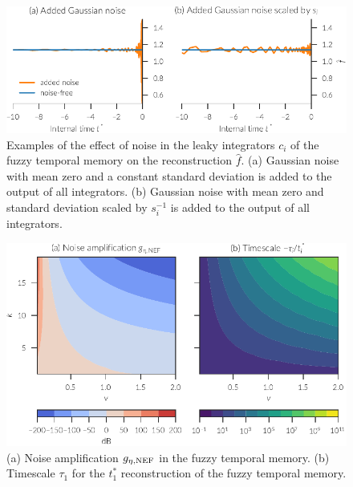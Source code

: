 \begin{figure}
    \centering
    \includegraphics{figures/fuzzy-mem-noise-example}
    \caption[Example of the effect of noise on the fuzzy temporal memory.]{Examples of the effect of noise in the leaky integrators $c_i$ of the fuzzy temporal memory on the reconstruction $\hat{f}$. (a) Gaussian noise with mean zero and a constant standard deviation is added to the output of all integrators. (b) Gaussian noise with mean zero and standard deviation scaled by $s_i^{-1}$ is added to the output of all integrators.}\label{fig:fuzzy-mem-noise-example}
\end{figure}
\begin{figure}
    \centering
    \includegraphics{figures/fuzzy-mem-noise-ts}
    \caption[Noise amplification and timescales in fuzzy temporal memory.]{(a) Noise amplification $g_{\eta,{\mathrm{NEF}}}$ in the fuzzy temporal memory. (b) Timescale $\tau_1$ for the $t^*_1$ reconstruction of the fuzzy temporal memory.}\label{fig:fuzzy-mem-noise-ts}
\end{figure}

